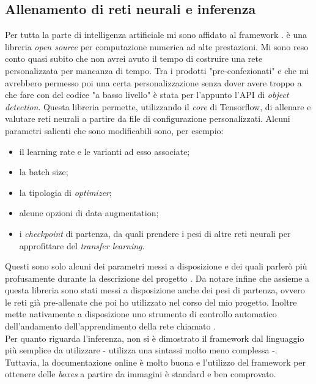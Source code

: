     \subsection{Allenamento di reti neurali e inferenza}
    Per tutta la parte di intelligenza artificiale mi sono affidato al framework \cite{prod:tensorflow}.  è una libreria \textit{open source} per computazione numerica ad alte prestazioni. Mi sono reso conto quasi subito che non avrei avuto il tempo di costruire una rete personalizzata per mancanza di tempo. Tra i prodotti "pre-confezionati" e che mi avrebbero permesso poi una certa personalizzazione senza dover avere troppo a che fare con del codice "a basso livello" è stata per l'appunto l'API di \textit{object detection}\cite{prod:tensorflow_o_d_api}. Questa libreria permette, utilizzando il \textit{core} di Tensorflow, di allenare e valutare reti neurali a partire da file di configurazione personalizzati. Alcuni parametri salienti che sono modificabili sono, per esempio:
    \begin{itemize}
    	\item il \gls{learning rate} e le varianti ad esso associate;
    	\item la \gls{batch size};
    	\item la tipologia di \textit{optimizer};
    	\item alcune opzioni di \gls{data augmentation};
    	\item i \textit{checkpoint} di partenza, da quali prendere i pesi di altre reti neurali per approfittare del \textit{transfer learning}.
    \end{itemize}
    Questi sono solo alcuni dei parametri messi a disposizione e dei quali parlerò più profusamente durante la descrizione del progetto . Da notare infine che assieme a questa libreria sono stati messi a disposizione anche dei pesi di partenza, ovvero le reti già pre-allenate che poi ho utilizzato nel corso del mio progetto. Inoltre  mette nativamente a disposizione uno strumento di controllo automatico dell'andamento dell'apprendimento della rete chiamato .
    \medskip
    \\Per quanto riguarda l'inferenza,  non si è dimostrato il framework dal linguaggio più semplice da utilizzare - \cite{prod:keras} utilizza una sintassi molto meno complessa -. Tuttavia, la documentazione online è molto buona e l'utilizzo del framework per ottenere delle \textit{boxes} a partire da immagini è standard e ben comprovato.

